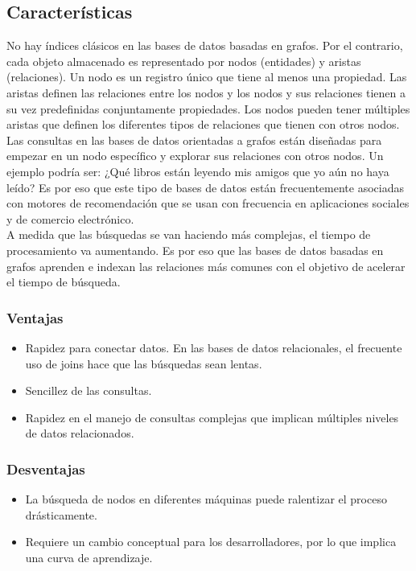\subsection{Características}
No hay índices clásicos en las bases de datos basadas en grafos. Por el contrario, cada objeto almacenado es representado por nodos (entidades) y aristas (relaciones). Un nodo es un registro único que tiene al menos una propiedad. Las aristas definen las relaciones entre los nodos y los nodos y sus relaciones tienen a su vez predefinidas conjuntamente propiedades. Los nodos pueden tener múltiples aristas que definen los diferentes tipos de relaciones que tienen con otros nodos.
\newpage
Las consultas en las bases de datos orientadas a grafos están diseñadas para empezar en un nodo específico y explorar sus relaciones con otros nodos. Un ejemplo podría ser: ¿Qué libros están leyendo mis amigos que yo aún no haya leído? Es por eso que este tipo de bases de datos están frecuentemente asociadas con motores de recomendación que se usan con frecuencia en aplicaciones sociales y de comercio electrónico.\\

A medida que las búsquedas se van haciendo más complejas, el tiempo de procesamiento va aumentando. Es por eso que las bases de datos basadas en grafos aprenden e indexan las relaciones más comunes con el objetivo de acelerar el tiempo de búsqueda. 
\subsubsection{Ventajas}
\begin{itemize}
	\item Rapidez para conectar datos. En las bases de datos relacionales, el frecuente uso de joins hace que las búsquedas sean lentas.
	\item Sencillez de las consultas.
	\item Rapidez en el manejo de consultas complejas que implican múltiples niveles de datos relacionados.
\end{itemize}
\subsubsection{Desventajas}
\begin{itemize}
	\item La búsqueda de nodos en diferentes máquinas puede ralentizar el proceso drásticamente.
	\item Requiere un cambio conceptual para los desarrolladores, por lo que implica una curva de aprendizaje.
\end{itemize}\cite{15}


